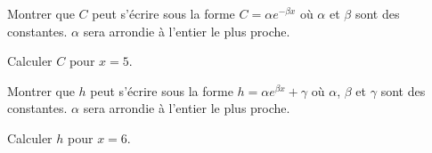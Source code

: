 \documentclass[a4paper,12pt]{scrartcl}
\begin{document}
\clearpage
\fiche{}

\begin{multicols}{3}
 
 
 
 
 
\end{multicols}

\begin{multicols}{3}
 
 
\end{multicols}


\begin{multicols}{2}

\end{multicols}



\question{}
Montrer que $C$ peut s'écrire sous la forme $C = \alpha e^{- \beta x}$ où $\alpha$ et $\beta$ sont des constantes. $\alpha$ sera arrondie à l'entier le plus proche.

\question{}
Calculer $C$ pour $x = 5$.


\question{}
Montrer que $h$ peut s'écrire sous la forme $h = \alpha e^{\beta x} + \gamma$ où $\alpha$, $\beta$ et $\gamma$ sont des constantes. $\alpha$ sera arrondie à l'entier le plus proche.

\question{}
Calculer $h$ pour $x = 6$.


\begin{multicols}{2}
 
 
 
 
\end{multicols}
\end{document}
